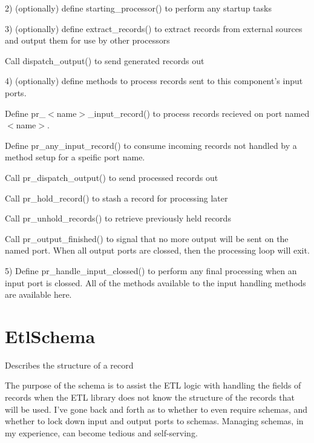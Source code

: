 2) (optionally) define starting\-\_\-processor() to perform any startup tasks

3) (optionally) define extract\-\_\-records() to extract records from external sources and output them for use by other processors


\begin{DoxyItemize}
\item Call dispatch\-\_\-output() to send generated records out
\end{DoxyItemize}

4) (optionally) define methods to process records sent to this component's input ports.


\begin{DoxyItemize}
\item Define pr\-\_\-$<$name$>$\-\_\-input\-\_\-record() to process records recieved on port named $<$name$>$.
\item Define pr\-\_\-any\-\_\-input\-\_\-record() to consume incoming records not handled by a method setup for a speific port name.
\item Call pr\-\_\-dispatch\-\_\-output() to send processed records out
\item Call pr\-\_\-hold\-\_\-record() to stash a record for processing later
\item Call pr\-\_\-unhold\-\_\-records() to retrieve previously held records
\item Call pr\-\_\-output\-\_\-finished() to signal that no more output will be sent on the named port. When all output ports are clossed, then the processing loop will exit.
\end{DoxyItemize}

5) Define pr\-\_\-handle\-\_\-input\-\_\-clossed() to perform any final processing when an input port is clossed. All of the methods available to the input handling methods are available here.

\section*{Etl\-Schema }

Describes the structure of a record

The purpose of the schema is to assist the E\-T\-L logic with handling the fields of records when the E\-T\-L library does not know the structure of the records that will be used. I've gone back and forth as to whether to even require schemas, and whether to lock down input and output ports to schemas. Managing schemas, in my experience, can become tedious and self-\/serving.

